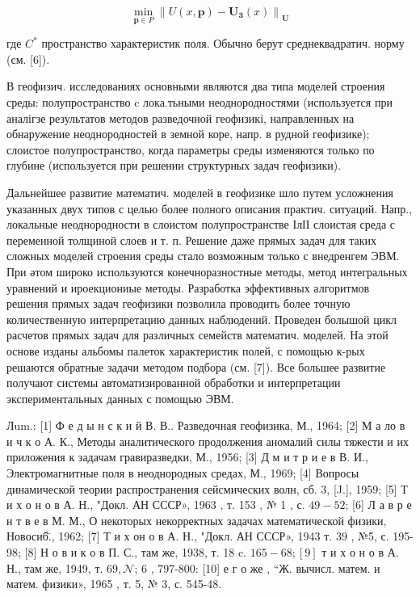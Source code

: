 \documentclass[10pt]{article}
\begin{document}
\[

\min _{\boldsymbol{p} \in P}\left\|U(x, \boldsymbol{p})-\boldsymbol{U}_{\boldsymbol{3}}(x)\right\|_{\boldsymbol{U}}

\]



где $C^{*}$ пространство характеристик поля. Обычно берут среднеквадратич. норму (см. [6]).



В геофизич. исследованиях основными являются два типа моделей строения среды: полупространство c лока.тьными неоднородностями (используется при аналігзе результатов методов разведочной геофизикі, направленных на обнаружение неоднородностей в земной коре, напр. в рудной геофизике); слоистое полупространство, когда параметры среды изменяются только по глубине (используется при решении структурных задач геофизики).



Дальнейшее развитие математич. моделей в геофизике шло путем усложнения указанных двух типов с целью более полного описания практич. ситуаций. Напр., локальные неоднородности в слоистом полупространстве ІлІІ слоистая среда с переменной толщиной слоев и т. п. Решение даже прямых задач для таких сложных моделей строения среды стало возможным только с внедренгем ЭВМ. При әтом широко используются конечноразностные методы, метод интегральных уравнений и ироекциониые методы. Разработка эффективных алгоритмов решения прямых задач геофизики позволила проводить более точную количественную интерпретацию данных наблюдений. Проведен болышой цикл расчетов прямых задач для различных семейств математич. моделей. На этой основе изданы альбомы палеток характеристик полей, с помощью к-рых решаются обратные задачи методом подбора (см. [7]). Все большее развитие получают системы автоматизированной обработки и интерпретации экспериментальных данных с помощью ЭВМ.



Лum.: [1] Ф е д ы н с к и й В. В.. Разведочная геофизика, М., 1964; [2] М а ло в и ч к о А. К., Методы аналитического продолжения аномалий силы тяжести и их приложения к задачам гравиразведки, М., 1956; [3] Д м и т р и е в В. И., Электромагнитные поля в неоднородных средах, М., 1969; [4] Вопросы динамической теории распространения сейсмических волн, сб. 3, [J.], 1959; [5] Т и х о н о в А. Н., "Докл. АН СССР», 1963 , т. 153 , № 1 , с. $49-52$; [6] Л а в р е н т в е в М. М., О некоторых некорректных задачах математической физики, Новосиб̈., 1962; [7] Т и х он о в А. Н., "Докл. АН СССР», 1943 т. 39 , №5, с. 195-98; [8] Н о в и к о в П. С., там же, 1938, т. 18 c. $165-68 ;[9]$ т и х о н о в А. Н., там же, 1949, т. $69, \mathcal{N}$; 6 , 797-800: [10] е г о же , “Ж. вычисл. матем. и матем. физики», 1965 , т. 5, № 3, с. 545-48.
\end{document}
